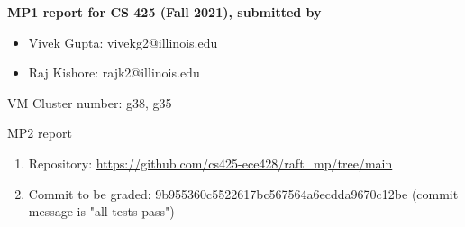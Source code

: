 \documentclass[11pt]{article}
\begin{document}
\noindent
{\bf MP1 report for CS 425 (Fall 2021), submitted by
\begin{itemize}
\item Vivek Gupta: vivekg2@illinois.edu
\item Raj Kishore: rajk2@illinois.edu
\end{itemize}
VM Cluster number: g38, g35
}

\noindent\hrulefill

\begin{description}
\item[MP2 report]
\end{description}

\begin{enumerate}

\item Repository: \url{https://github.com/cs425-ece428/raft_mp/tree/main}

\item Commit to be graded: 9b955360c5522617bc567564a6ecdda9670c12be (commit message is "all  tests pass")

\end{enumerate}
\end{document}
